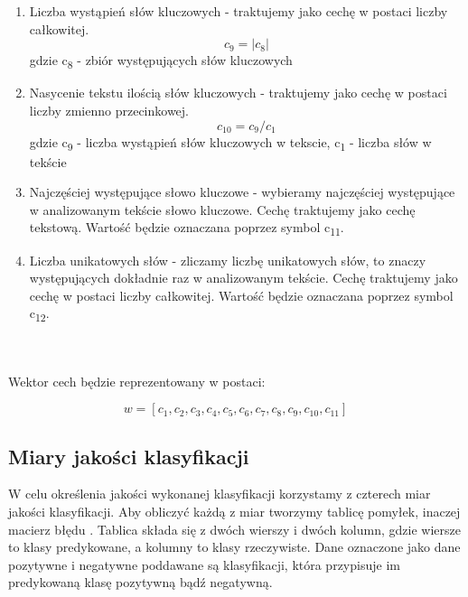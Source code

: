 \documentclass{classrep}
\begin{document}
\begin{enumerate}
  \item Liczba wystąpień słów kluczowych - traktujemy jako cechę w postaci liczby całkowitej.\begin{equation}  c_9 = | c_8 | \end{equation} gdzie c\textsubscript{8} - zbiór występujących słów kluczowych\\
  \item Nasycenie tekstu ilością słów kluczowych - traktujemy jako cechę w postaci liczby zmienno przecinkowej.  \begin{equation} c_{10} = c_9 / c_1 \end{equation}  gdzie c\textsubscript{9} - liczba wystąpień słów kluczowych w tekscie, c\textsubscript{1} - liczba słów w tekście\\
  \item Najczęściej występujące słowo kluczowe - wybieramy najczęściej występujące w analizowanym tekście słowo kluczowe. Cechę traktujemy jako cechę tekstową. Wartość będzie oznaczana poprzez symbol  c\textsubscript{11}.\\
  \item Liczba unikatowych słów - zliczamy liczbę unikatowych słów, to znaczy występujących dokładnie raz w analizowanym tekście. Cechę traktujemy jako cechę w postaci liczby całkowitej. Wartość będzie oznaczana poprzez symbol  c\textsubscript{12}.\\
\end{enumerate}

\ \\ \\
Wektor cech będzie reprezentowany w postaci: 

\begin{equation} w = [c_1, c_2, c_3, c_4, c_5, c_6, c_7, c_8, c_9, c_{10}, c_{11}] \end{equation}



\subsection{Miary jakości klasyfikacji} 
W celu określenia jakości wykonanej klasyfikacji korzystamy z czterech miar jakości klasyfikacji. Aby obliczyć każdą z miar tworzymy tablicę pomyłek, inaczej macierz błędu \cite{tablica}. Tablica składa się z dwóch wierszy i dwóch kolumn, gdzie wiersze to klasy predykowane, a kolumny to klasy rzeczywiste. Dane oznaczone jako dane pozytywne i negatywne poddawane są klasyfikacji, która przypisuje im predykowaną klasę pozytywną bądź negatywną.\\
\end{document}
